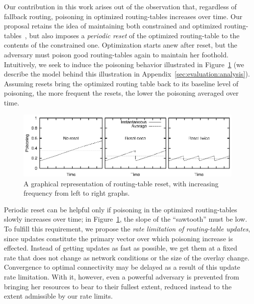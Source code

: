 \documentclass[10pt,twocolumn]{article}
\begin{document}
\label{sec:design}
Our contribution in this work arises out of the observation that,
regardless of fallback routing, poisoning in optimized routing-tables
increases over time.
Our proposal retains the idea of maintaining both constrained and
optimized routing-tables~\cite{Castro2002}, but also imposes a
\emph{periodic reset} of the optimized routing-table to the contents of the
constrained one.  Optimization starts anew after reset, but the adversary must poison
good routing-tables again to maintain her foothold.  Intuitively,
we seek to induce the poisoning behavior illustrated in
Figure~\ref{fig:sawtooth} (we describe the model behind this
illustration in Appendix~\ref{sec:evaluation:analysis}).  Assuming resets bring the optimized routing
table back to its baseline level of poisoning, the more frequent the
resets, the lower the poisoning averaged over time.

\begin{figure}
\centerline{\includegraphics{graphs/equations/sawtooth}}
\caption{A graphical representation of routing-table reset, with
  increasing frequency from left to right graphs.} 
\label{fig:sawtooth}
\end{figure}

Periodic reset can be helpful only if poisoning in the optimized
routing-tables slowly increases over time; in Figure~\ref{fig:sawtooth}, the
slope of the ``sawtooth'' must be low. To fulfill this requirement, we 
propose the \emph{rate limitation of routing-table updates}, since updates 
constitute the primary vector over which poisoning increase
is effected.  Instead of getting updates as fast as possible, we get
them at a fixed rate that does not change as network conditions or the
size of the overlay change.   Convergence to optimal connectivity
may be delayed as a result of this update rate limitation.  With it,
however, even a powerful adversary is prevented from bringing her
resources to bear to their fullest extent, reduced instead to the extent
admissible by our rate limits.
\end{document}
